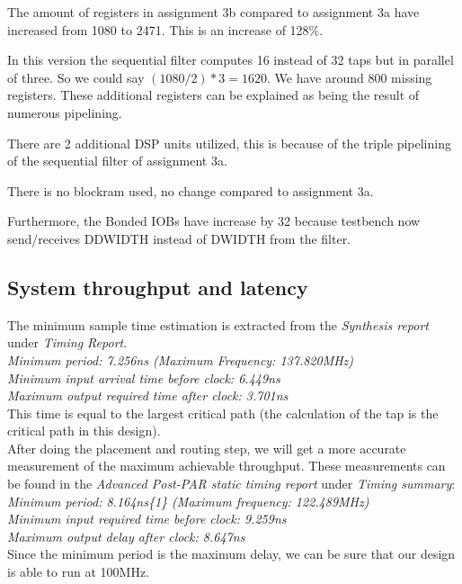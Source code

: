 \documentclass[a4paper,twoside,11pt, fleqn]{article}
\begin{document}
The amount of registers in assignment 3b compared to assignment 3a have increased from 1080 to 2471. This is an increase of 128\%. 

In this version the sequential filter computes 16 instead of 32 taps but in parallel of three. So we could say $(1080/2)*3=1620$. We have around 800 missing registers. These additional registers can be explained as being the result of numerous pipelining.

\smallskip

There are 2 additional DSP units utilized, this is because of the triple pipelining of the sequential filter of assignment 3a.

There is no blockram used, no change compared to assignment 3a.

Furthermore, the Bonded IOBs have increase by 32 because testbench now send/receives DDWIDTH instead of DWIDTH from the filter.

\subsection{System throughput and latency}
\label{sec:thr3b}
The minimum sample time estimation is extracted from the \textit{Synthesis report} under \textit{Timing Report}.\\

   \textit{Minimum period:  7.256ns (Maximum Frequency: 137.820MHz)\\
   Minimum input arrival time before clock: 6.449ns\\
   Maximum output required time after clock: 3.701ns}\\

This time is equal to the largest critical path (the calculation of the tap is the critical path in this design).\\

After doing the placement and routing step, we will get a more accurate measurement of the maximum achievable throughput. These measurements can be found in the \textit{Advanced Post-PAR static timing report} under \textit{Timing summary}:\\

\textit{Minimum period:   8.164ns\{1\}   (Maximum frequency: 122.489MHz)\\
   Minimum input required time before clock:   9.259ns\\
   Maximum output delay after clock:   8.647ns}\\

Since the minimum period is the maximum delay, we can be sure that our design is able to run at 100MHz.
\end{document}
